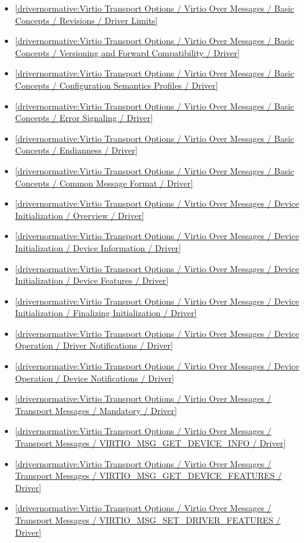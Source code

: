 \begin{itemize}
\item \ref{drivernormative:Virtio Transport Options / Virtio Over Messages / Basic Concepts / Revisions / Driver Limits}
\item \ref{drivernormative:Virtio Transport Options / Virtio Over Messages / Basic Concepts / Versioning and Forward Compatibility / Driver}
\item \ref{drivernormative:Virtio Transport Options / Virtio Over Messages / Basic Concepts / Configuration Semantics Profiles / Driver}
\item \ref{drivernormative:Virtio Transport Options / Virtio Over Messages / Basic Concepts / Error Signaling / Driver}
\item \ref{drivernormative:Virtio Transport Options / Virtio Over Messages / Basic Concepts / Endianness / Driver}
\item \ref{drivernormative:Virtio Transport Options / Virtio Over Messages / Basic Concepts / Common Message Format / Driver}
\item \ref{drivernormative:Virtio Transport Options / Virtio Over Messages / Device Initialization / Overview / Driver}
\item \ref{drivernormative:Virtio Transport Options / Virtio Over Messages / Device Initialization / Device Information / Driver}
\item \ref{drivernormative:Virtio Transport Options / Virtio Over Messages / Device Initialization / Device Features / Driver}
\item \ref{drivernormative:Virtio Transport Options / Virtio Over Messages / Device Initialization / Finalizing Initialization / Driver}
\item \ref{drivernormative:Virtio Transport Options / Virtio Over Messages / Device Operation / Driver Notifications / Driver}
\item \ref{drivernormative:Virtio Transport Options / Virtio Over Messages / Device Operation / Device Notifications / Driver}
\item \ref{drivernormative:Virtio Transport Options / Virtio Over Messages / Transport Messages / Mandatory / Driver}
\item \ref{drivernormative:Virtio Transport Options / Virtio Over Messages / Transport Messages / VIRTIO_MSG_GET_DEVICE_INFO / Driver}
\item \ref{drivernormative:Virtio Transport Options / Virtio Over Messages / Transport Messages / VIRTIO_MSG_GET_DEVICE_FEATURES / Driver}
\item \ref{drivernormative:Virtio Transport Options / Virtio Over Messages / Transport Messages / VIRTIO_MSG_SET_DRIVER_FEATURES / Driver}

\end{itemize}
